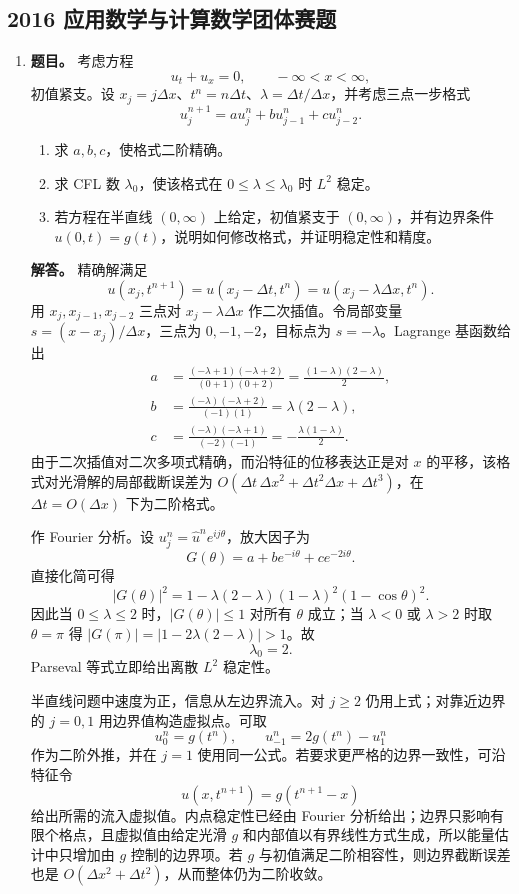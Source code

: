 ﻿\documentclass[UTF8,12pt]{ctexart}
\begin{document}
\subsection{2016 应用数学与计算数学团体赛题}
\begin{enumerate}[label=\textbf{\arabic*.},leftmargin=2.2em]
\item \textbf{题目。} 考虑方程
\[
u_t+u_x=0,\qquad -\infty<x<\infty,
\]
初值紧支。设 \(x_j=j\Delta x\)、\(t^n=n\Delta t\)、\(\lambda=\Delta t/\Delta x\)，并考虑三点一步格式
\[
u_j^{n+1}=a u_j^n+b u_{j-1}^n+c u_{j-2}^n .
\]
\begin{enumerate}[label=(\arabic*),leftmargin=2em]
\item 求 \(a,b,c\)，使格式二阶精确。
\item 求 CFL 数 \(\lambda_0\)，使该格式在 \(0\le \lambda\le \lambda_0\) 时 \(L^2\) 稳定。
\item 若方程在半直线 \((0,\infty)\) 上给定，初值紧支于 \((0,\infty)\)，并有边界条件 \(u(0,t)=g(t)\)，说明如何修改格式，并证明稳定性和精度。
\end{enumerate}

\textbf{解答。} 精确解满足
\[
u(x_j,t^{n+1})=u(x_j-\Delta t,t^n)
              =u(x_j-\lambda\Delta x,t^n).
\]
用 \(x_j,x_{j-1},x_{j-2}\) 三点对 \(x_j-\lambda\Delta x\) 作二次插值。令局部变量 \(s=(x-x_j)/\Delta x\)，三点为 \(0,-1,-2\)，目标点为 \(s=-\lambda\)。Lagrange 基函数给出
\[
\begin{aligned}
a&=\frac{(-\lambda+1)(-\lambda+2)}{(0+1)(0+2)}
  =\frac{(1-\lambda)(2-\lambda)}2,\\
b&=\frac{(-\lambda)(-\lambda+2)}{(-1)(1)}
  =\lambda(2-\lambda),\\
c&=\frac{(-\lambda)(-\lambda+1)}{(-2)(-1)}
  =-\frac{\lambda(1-\lambda)}2 .
\end{aligned}
\]
由于二次插值对二次多项式精确，而沿特征的位移表达正是对 \(x\) 的平移，该格式对光滑解的局部截断误差为 \(O(\Delta t\,\Delta x^2+\Delta t^2\Delta x+\Delta t^3)\)，在 \(\Delta t=O(\Delta x)\) 下为二阶格式。

作 Fourier 分析。设 \(u_j^n=\widehat u^n e^{ij\theta}\)，放大因子为
\[
G(\theta)=a+b e^{-i\theta}+c e^{-2i\theta}.
\]
直接化简可得
\[
|G(\theta)|^2
=1-\lambda(2-\lambda)(1-\lambda)^2(1-\cos\theta)^2 .
\]
因此当 \(0\le \lambda\le2\) 时，\(|G(\theta)|\le1\) 对所有 \(\theta\) 成立；当 \(\lambda<0\) 或 \(\lambda>2\) 时取 \(\theta=\pi\) 得 \(|G(\pi)|=|1-2\lambda(2-\lambda)|>1\)。故
\[
\lambda_0=2.
\]
Parseval 等式立即给出离散 \(L^2\) 稳定性。

半直线问题中速度为正，信息从左边界流入。对 \(j\ge2\) 仍用上式；对靠近边界的 \(j=0,1\) 用边界值构造虚拟点。可取
\[
u_0^n=g(t^n),\qquad
u_{-1}^n=2g(t^n)-u_1^n
\]
作为二阶外推，并在 \(j=1\) 使用同一公式。若要求更严格的边界一致性，可沿特征令
\[
u(x,t^{n+1})=g(t^{n+1}-x)
\]
给出所需的流入虚拟值。内点稳定性已经由 Fourier 分析给出；边界只影响有限个格点，且虚拟值由给定光滑 \(g\) 和内部值以有界线性方式生成，所以能量估计中只增加由 \(g\) 控制的边界项。若 \(g\) 与初值满足二阶相容性，则边界截断误差也是 \(O(\Delta x^2+\Delta t^2)\)，从而整体仍为二阶收敛。


\end{enumerate}
\end{document}

